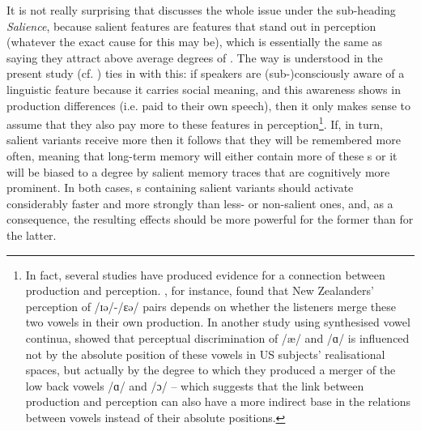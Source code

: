 It is not really surprising that \textcite{pierrehumbert2006} discusses the whole issue under the sub-heading \emph{Salience}, because salient features are features that stand out in perception (whatever the exact cause for this may be), which is essentially the same as saying they attract above average degrees of .
The way  is understood in the present study (cf. ) ties in with this: if speakers are (sub-)consciously aware of a linguistic feature because it carries social meaning, and this awareness shows in production differences (i.e.  paid to their own speech), then it only makes sense to assume that they also pay more  to these features in perception\footnote{In fact, several studies have produced evidence for a connection between production and perception. \cite{hayetal2006b}, for instance, found that New Zealanders' perception of /ɪə/-/ɛə/ pairs depends on whether the listeners merge these two vowels in their own production. In another study using synthesised vowel continua, \textcite{kendallfridland2017} showed that perceptual discrimination of /æ/ and /ɑ/ is influenced not by the absolute position of these vowels in US subjects' realisational spaces, but actually by the degree to which they produced a merger of the low back vowels /ɑ/ and /ɔ/ -- which suggests that the link between production and perception can also have a more indirect base in the relations between vowels instead of their absolute positions.}.
If, in turn, salient variants receive more  then it follows that they will be remembered more often, meaning that long-term memory will either contain more of these s or it will be biased to a degree by salient memory traces that are cognitively more prominent.
In both cases, s containing salient variants should activate considerably faster and more strongly than less- or non-salient ones, and, as a consequence, the resulting  effects should be more powerful for the former than for the latter.

